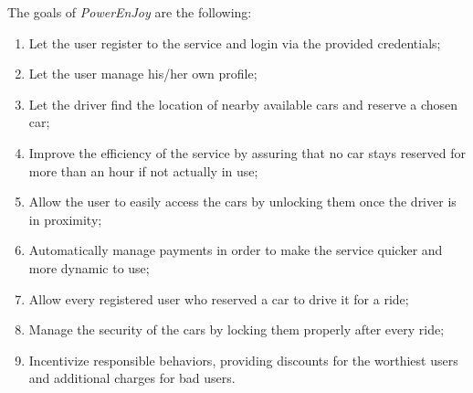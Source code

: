 The goals of \hbox{\emph{PowerEnJoy}} are the following:

\begin{enumerate}
\item Let the user register to the service and login via the provided credentials;
\item Let the user manage his/her own profile;
\item Let the driver find the location of nearby available cars and reserve a chosen car;
\item Improve the efficiency of the service by assuring that no car stays reserved for more than an hour if not actually in use;
\item Allow the user to easily access the cars by unlocking them once the driver is in proximity;
\item Automatically manage payments in order to make the service quicker and more dynamic to use; 
\item Allow every registered user who reserved a car to drive it for a ride;
\item Manage the security of the cars by locking them properly after every ride;
\item Incentivize responsible behaviors, providing discounts for the worthiest users and additional charges for bad users.
\end{enumerate}